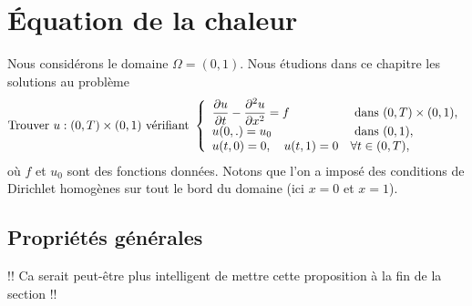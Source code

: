 \documentclass[12pt,a4paper,twoside]{article}
\begin{document}
\begin{exercise}
\begin{enumerate}
  \end{enumerate}
  

\end{exercise}


\section{\'Equation de la chaleur}

Nous consid\'erons le domaine $\Omega = (0,1)$.
Nous \'etudions dans ce chapitre les solutions au probl\`eme
\begin{equation}
  \label{eq:chaleur_Dir}
  \text{Trouver $u : (0,T) \times (0,1)$ v\'erifiant }
  \left\{
    \begin{array}{l l}
      \dfrac{\partial u}{\partial t} - \dfrac{\partial^2 u}{\partial x^2} = f 
      &\text{ dans } (0,T) \times (0,1) ,
      \\
      u(0,.) = u_0 
      & \text{ dans } (0,1) ,
      \\
      u(t,0) = 0 , \quad u(t,1) = 0 & \forall t \in (0,T) ,
    \end{array}
  \right.
\end{equation}
o\`u $f$ et $u_0$ sont des fonctions donn\'ees.
Notons que l'on a impos\'e des conditions de Dirichlet homog\`enes sur tout le bord du domaine
(ici $x=0$ et $x=1$).

\subsection{Propri\'et\'es g\'en\'erales}
\label{subsec:chaleur_prop}


!! Ca serait peut-\^etre plus intelligent de mettre cette proposition \`a la fin de la section !!
\end{document}
